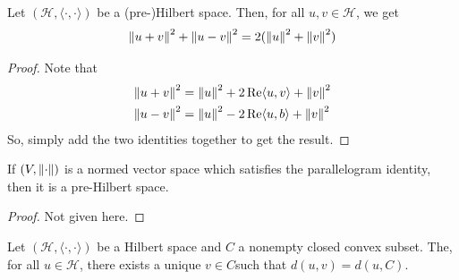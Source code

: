 \documentclass[11pt,leqno,oneside]{amsbook}
\numberwithin{thm}{section}
\renewcommand{\H}{\mathcal{H}} %
\begin{document}
\begin{prop}
  Let \((\H,\langle \cdot, \cdot \rangle)\) be a (pre-)Hilbert
  space. Then, for all \(u,v \in \H\), we get \[
    \norm[u+v]^2 + \norm[u-v]^2 = 2(\norm[u]^2 + \norm[v]^2)
  \]
\end{prop}
\begin{proof}
  Note that
  \begin{align*}
    \norm[u+v]^2 & = \norm[u]^2 + 2 \Re \langle u,v \rangle +
                   \norm[v]^2 \\
    \norm[u-v]^2 & = \norm[u]^2 - 2 \Re \langle u,b \rangle + \norm[v]^2
  \end{align*}
  So, simply add the two identities together to get the result.
\end{proof}
\begin{thm}
  If \((V,\norm)\) is a normed vector space which satisfies the
  parallelogram identity, then it is a pre-Hilbert space.
\end{thm}
\begin{proof}
  Not given here.
\end{proof}
\begin{thm}\label{convex-subspace-distance-thm}
  Let \((\H,\langle \cdot,\cdot \rangle)\) be a Hilbert space and
  \(C\) a nonempty closed convex subset. The, for all \(u \in \H\),
  there exists a unique \(v \in C\)such that \(d(u,v) = d(u,C)\).
\end{thm}
\end{document}

